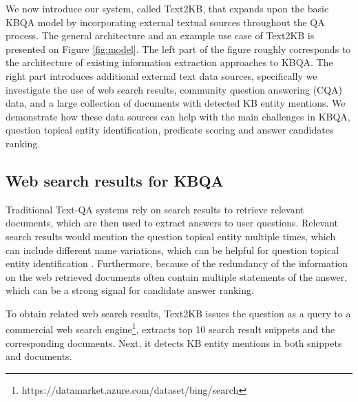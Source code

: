 We now introduce our system, called Text2KB, that expands upon the basic KBQA model by incorporating external textual sources throughout the QA process. The general architecture and an example use case of Text2KB is presented on Figure \ref{fig:model}. 
The left part of the figure roughly corresponds to the architecture of existing information extraction approaches to KBQA.
The right part introduces additional external text data sources, specifically
we investigate the use of web search results, community question answering (CQA) data, and a large collection of documents with detected KB entity mentions.
We demonstrate how these data sources can help with the main challenges in KBQA, \ie question topical entity identification, predicate scoring and answer candidates ranking.


\subsection{Web search results for KBQA}
\label{section:method:web}

Traditional Text-QA systems rely on search results to retrieve relevant documents, which are then used to extract answers to user questions.
Relevant search results would mention the question topical entity multiple times, which can include different name variations, which can be helpful for question topical entity identification \cite{SMAPH_ERD:2014}.
Furthermore, because of the redundancy of the information on the web \cite{Lin:2007:EPU:1229179.1229180} retrieved documents often contain multiple statements of the answer, which can be a strong signal for candidate answer ranking.

To obtain related web search results, Text2KB issues the question as a query to a commercial web search engine\footnote{https://datamarket.azure.com/dataset/bing/search}, extracts top 10 search result snippets and the corresponding documents.
Next, it detects KB entity mentions in both snippets and documents.

